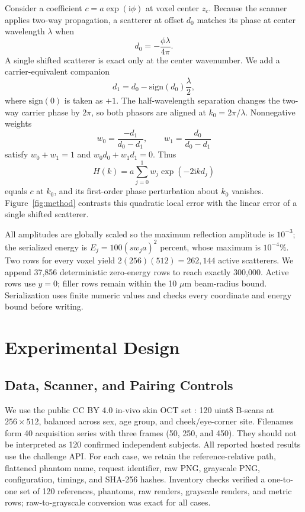\documentclass[runningheads]{llncs}
\begin{document}
Consider a coefficient $c=a\exp(\mathrm{i}\phi)$ at voxel center $z_c$.
Because the scanner applies two-way propagation, a scatterer at offset $d_0$
matches its phase at center wavelength $\lambda$ when
\begin{equation}
 d_0=-\frac{\phi\lambda}{4\pi}.
\end{equation}
A single shifted scatterer is exact only at the center wavenumber. We add a
carrier-equivalent companion
\begin{equation}
 d_1=d_0-\mathrm{sign}(d_0)\frac{\lambda}{2},
\end{equation}
where $\mathrm{sign}(0)$ is taken as $+1$. The half-wavelength separation
changes the two-way carrier phase by $2\pi$, so both phasors are aligned at
$k_0=2\pi/\lambda$. Nonnegative weights
\begin{equation}
 w_0=\frac{-d_1}{d_0-d_1},\qquad
 w_1=\frac{d_0}{d_0-d_1}
 \label{eq:weights}
\end{equation}
satisfy $w_0+w_1=1$ and $w_0d_0+w_1d_1=0$. Thus
\begin{equation}
 H(k)=a\sum_{j=0}^{1}w_j\exp(-2\mathrm{i}kd_j)
\end{equation}
equals $c$ at $k_0$, and its first-order phase perturbation about $k_0$
vanishes. Figure~\ref{fig:method} contrasts this quadratic local error with the
linear error of a single shifted scatterer.

All amplitudes are globally scaled so the maximum reflection amplitude is
$10^{-3}$; the serialized energy is $E_j=100(sw_ja)^2$ percent, whose maximum
is $10^{-4}\%$. Two rows for every voxel yield
$2(256)(512)=262{,}144$ active scatterers. We append 37,856 deterministic
zero-energy rows to reach exactly 300,000. Active rows use $y=0$; filler rows
remain within the 10 $\mu$m beam-radius bound. Serialization uses finite
numeric values and checks every coordinate and energy bound before writing.

\section{Experimental Design}

\subsection{Data, Scanner, and Pairing Controls}

We use the public CC BY 4.0 in-vivo skin OCT set
\cite{matveev2025dataset,sovetsky2026skin}: 120 uint8 B-scans at
$256\!\times\!512$, balanced across sex, age group, and cheek/eye-corner site.
Filenames form 40 acquisition series with three frames (50, 250, and 450).
They should not be interpreted as 120 confirmed independent subjects. All
reported hosted results use the challenge API. For each case, we retain the
reference-relative path, flattened phantom name, request identifier, raw PNG,
grayscale PNG, configuration, timings, and SHA-256 hashes. Inventory checks
verified a one-to-one set of 120 references, phantoms, raw renders, grayscale
renders, and metric rows; raw-to-grayscale conversion was exact for all cases.
\end{document}
